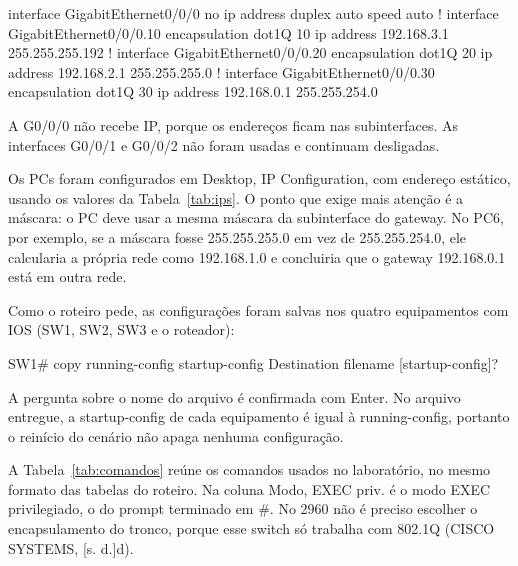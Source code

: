 \begin{cmd}
interface GigabitEthernet0/0/0
 no ip address
 duplex auto
 speed auto
!
interface GigabitEthernet0/0/0.10
 encapsulation dot1Q 10
 ip address 192.168.3.1 255.255.255.192
!
interface GigabitEthernet0/0/0.20
 encapsulation dot1Q 20
 ip address 192.168.2.1 255.255.255.0
!
interface GigabitEthernet0/0/0.30
 encapsulation dot1Q 30
 ip address 192.168.0.1 255.255.254.0
\end{cmd}

A G0/0/0 não recebe IP, porque os endereços ficam nas subinterfaces. As interfaces G0/0/1 e G0/0/2 não foram usadas e continuam desligadas.


Os PCs foram configurados em Desktop, IP Configuration, com endereço estático, usando os valores da Tabela~\ref{tab:ips}. O ponto que exige mais atenção é a máscara: o PC deve usar a mesma máscara da subinterface do gateway. No PC6, por exemplo, se a máscara fosse 255.255.255.0 em vez de 255.255.254.0, ele calcularia a própria rede como 192.168.1.0 e concluiria que o gateway 192.168.0.1 está em outra rede.


Como o roteiro pede, as configurações foram salvas nos quatro equipamentos com IOS (SW1, SW2, SW3 e o roteador):

\begin{cmd}
SW1# copy running-config startup-config
Destination filename [startup-config]?
\end{cmd}

A pergunta sobre o nome do arquivo é confirmada com Enter. No arquivo entregue, a startup-config de cada equipamento é igual à running-config, portanto o reinício do cenário não apaga nenhuma configuração.


A Tabela~\ref{tab:comandos} reúne os comandos usados no laboratório, no mesmo formato das tabelas do roteiro. Na coluna Modo, EXEC priv. é o modo EXEC privilegiado, o do prompt terminado em \#. No 2960 não é preciso escolher o encapsulamento do tronco, porque esse switch só trabalha com 802.1Q (CISCO SYSTEMS, [s. d.]d).

